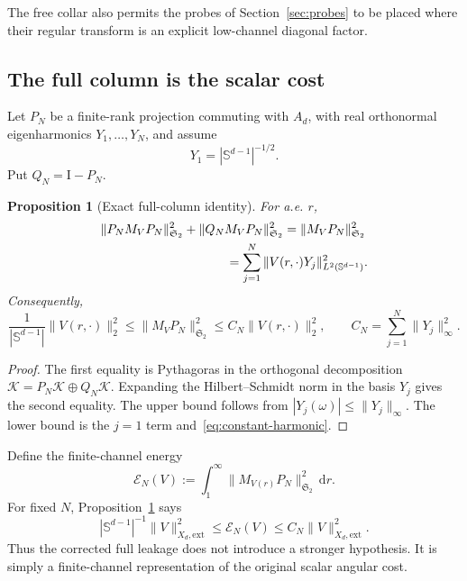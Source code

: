 \documentclass[11pt]{article}
\newcommand{\Sd}{\mathbb S^{d-1}}
\newcommand{\K}{\mathcal K}
\newcommand{\cE}{\mathcal E}
\newcommand{\HS}{\mathfrak S_2}
\newcommand{\Id}{\mathrm I}
\newcommand{\dd}{\,\mathrm d}
\newtheorem{proposition}[theorem]{Proposition}
\theoremstyle{definition}
\theoremstyle{remark}
\begin{document}
The free collar also permits the probes of Section~\ref{sec:probes} to be placed where their regular transform is an explicit low-channel diagonal factor.

\subsection{The full column is the scalar cost}

Let $P_N$ be a finite-rank projection commuting with $A_d$, with real orthonormal eigenharmonics $Y_1,\ldots,Y_N$, and assume
\begin{equation}
 Y_1=|\Sd|^{-1/2}.
 \label{eq:constant-harmonic}
\end{equation}
Put $Q_N=\Id-P_N$.

\begin{proposition}[Exact full-column identity]\label{prop:full-column}
For a.e. $r$,
\begin{align}
 &\|P_NM_VP_N\|_{\HS}^2+\|Q_NM_VP_N\|_{\HS}^2
   =\|M_VP_N\|_{\HS}^2 \notag\\
 &\hspace{35mm}=\sum_{j=1}^N\|V(r,\cdot)Y_j\|_{L^2(\Sd)}^2.
 \label{eq:column-exact}
\end{align}
Consequently,
\begin{equation}
 \frac{1}{|\Sd|}\|V(r,\cdot)\|_2^2
 \leq \|M_VP_N\|_{\HS}^2
 \leq C_N\|V(r,\cdot)\|_2^2,
 \qquad
 C_N=\sum_{j=1}^N\|Y_j\|_\infty^2.
 \label{eq:column-comparable}
\end{equation}
\end{proposition}

\begin{proof}
The first equality is Pythagoras in the orthogonal decomposition $\K=P_N\K\oplus Q_N\K$.  Expanding the Hilbert--Schmidt norm in the basis $Y_j$ gives the second equality.  The upper bound follows from $|Y_j(\omega)|\leq\|Y_j\|_\infty$.  The lower bound is the $j=1$ term and~\eqref{eq:constant-harmonic}.
\end{proof}

Define the finite-channel energy
\begin{equation}
 \cE_N(V)
 :=\int_1^\infty\|M_{V(r)}P_N\|_{\HS}^2\dd r.
 \label{eq:EN}
\end{equation}
For fixed $N$, Proposition~\ref{prop:full-column} says
\begin{equation}
 |\Sd|^{-1}\|V\|_{X_d,\mathrm{ext}}^2
 \leq\cE_N(V)\leq C_N\|V\|_{X_d,\mathrm{ext}}^2.
 \label{eq:EN-equivalence}
\end{equation}
Thus the corrected full leakage does not introduce a stronger hypothesis.  It is simply a finite-channel representation of the original scalar angular cost.
\end{document}
